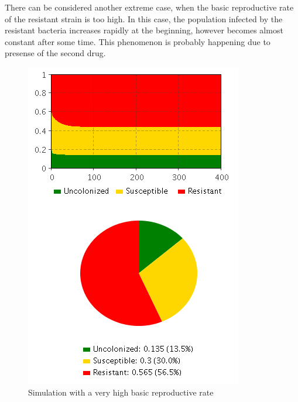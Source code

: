 There can be considered another extreme case, when the basic reproductive rate of the resistant strain is too high. In this case, the population infected by the resistant bacteria increases rapidly at the beginning, however becomes almost constant after some time. This phenomenon is probably happening due to presense of the second drug.

\begin{figure}[H]
  \centering
  \includegraphics[height=0.7\textwidth]{img/screens/result/result3}
  \caption{Simulation with a very high basic reproductive rate}
\end{figure}
